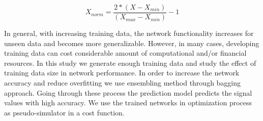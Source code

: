 \begin{equation}
X_{norm} = \frac{2*(X-X_{min})}{(X_{max}-X_{min})}-1
\end{equation}

In general, with increasing training data, the network functionality increases for unseen data and becomes more generalizable. However, in many cases, developing training data can cost considerable amount of computational and/or financial resources. In this study we generate enough training data and study the effect of training data size in network performance. In order to increase the network accuracy and reduce overfitting we use ensembling method through bagging approach. Going through these process the prediction model predicts the signal values with high accuracy. We use the trained networks in optimization process as pseudo-simulator in a cost function. 

